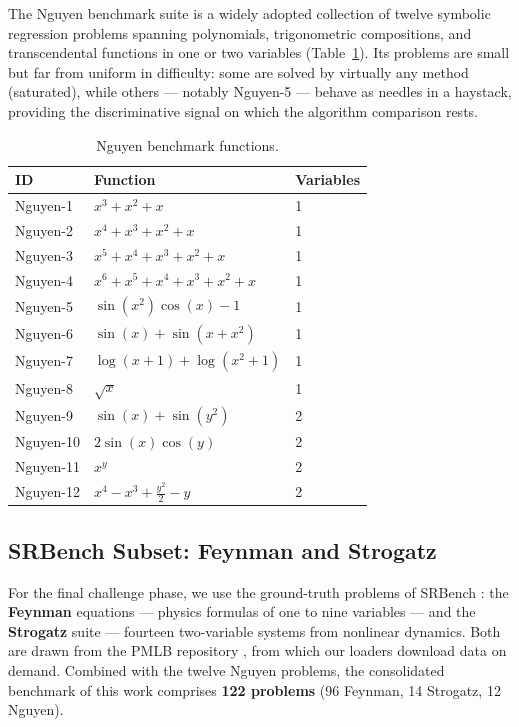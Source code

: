 The Nguyen benchmark suite \cite{uy_semantically-based_2011} is a widely adopted collection of twelve symbolic regression problems spanning polynomials, trigonometric compositions, and transcendental functions in one or two variables (Table~\ref{tab:nguyen_benchmarks}). Its problems are small but far from uniform in difficulty: some are solved by virtually any method (saturated), while others --- notably Nguyen-5 --- behave as needles in a haystack, providing the discriminative signal on which the algorithm comparison rests.

\begin{table}[htbp]
    \centering
    \caption{Nguyen benchmark functions.}
    \label{tab:nguyen_benchmarks}
    \begin{tabular}{lll}
    \toprule
    \textbf{ID} & \textbf{Function} & \textbf{Variables} \\
    \midrule
    Nguyen-1 & $x^3 + x^2 + x$ & 1 \\
    Nguyen-2 & $x^4 + x^3 + x^2 + x$ & 1 \\
    Nguyen-3 & $x^5 + x^4 + x^3 + x^2 + x$ & 1 \\
    Nguyen-4 & $x^6 + x^5 + x^4 + x^3 + x^2 + x$ & 1 \\
    Nguyen-5 & $\sin(x^2) \cos(x) - 1$ & 1 \\
    Nguyen-6 & $\sin(x) + \sin(x + x^2)$ & 1 \\
    Nguyen-7 & $\log(x + 1) + \log(x^2 + 1)$ & 1 \\
    Nguyen-8 & $\sqrt{x}$ & 1 \\
    Nguyen-9 & $\sin(x) + \sin(y^2)$ & 2 \\
    Nguyen-10 & $2\sin(x)\cos(y)$ & 2 \\
    Nguyen-11 & $x^y$ & 2 \\
    Nguyen-12 & $x^4 - x^3 + \frac{y^2}{2} - y$ & 2 \\
    \bottomrule
    \end{tabular}
\end{table}

\subsection{SRBench Subset: Feynman and Strogatz}
\label{sec:srbench_data}

For the final challenge phase, we use the ground-truth problems of SRBench \cite{lacava2021contemporary}: the \textbf{Feynman} equations \cite{udrescu_ai_2019} --- physics formulas of one to nine variables --- and the \textbf{Strogatz} suite --- fourteen two-variable systems from nonlinear dynamics. Both are drawn from the PMLB repository \cite{romano2021pmlb}, from which our loaders download data on demand. Combined with the twelve Nguyen problems, the consolidated benchmark of this work comprises \textbf{122 problems} (96 Feynman, 14 Strogatz, 12 Nguyen).

